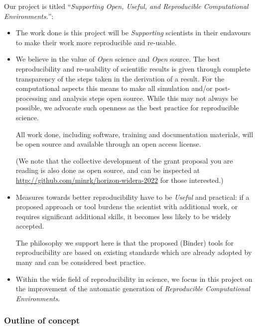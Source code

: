Our project is titled ``\emph{Supporting Open, Useful, and Reproducible Computational Environments.}'':
\begin{itemize}
\item The work done is this project will be \emph{Supporting} scientists in their
  endavours to make their work more reproducible and re-usable.
\item We believe in the value of \emph{Open} science and \emph{Open} source. The
  best reproducibility and re-usability of scientific results is given through
  complete transparency of the steps taken in the derivation of a result. For
  the computational aspects this means to make all simulation and/or
  post-processing and analysis steps open source. While this may not always be
  possible, we advocate such openness as the best practice for reproducible science.

  All work done, including software, training and documentation materials, will
  be open source and available through an open access license.

  (We note that the collective development of the grant proposal you are reading
  is also done as open source, and can be inspected at
  \url{http://github.com/minrk/horizon-widera-2022} for those interested.)

\item Measures towards better reproducibility have to be \emph{Useful} and
  practical: if a proposed approach or tool burdens the scientist with
  additional work, or requires significant additional skills, it becomes less
  likely to be widely accepted.

  The philosophy we support here is that the proposed (Binder) tools for
  reproducibility are based on existing standards which are already
  adopted by many and can be considered best practice.

\item Within the wide field of reproducibility in science, we focus in this
  project on the improvement of the automatic generation of \emph{Reproducible
    Computational Environments}.
\end{itemize}

\subsubsection{Outline of concept}

